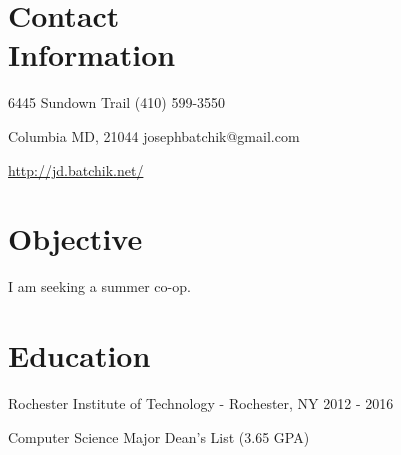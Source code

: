 \documentclass[a4paper,margin,line,11pt]{resume}
\newcommand{\rurl}[1]{\hfill {\footnotesize \url{#1}}}
\newcommand{\rdate}[1]{\hfill {\small #1}}
\begin{document}
\begin{resume}
\section{\mysidestyle Contact \\ Information}
	\begin{asparablank}
		\item 6445 Sundown Trail \hfill (410) 599-3550
		\item Columbia MD, 21044 \hfill josephbatchik@gmail.com
		\item \rurl{http://jd.batchik.net/}
	\end{asparablank}

\section{\mysidestyle Objective}
    I am seeking a summer co-op.

\section{\mysidestyle Education}
	\begin{compactdesc}
		\item[Rochester Institute of Technology] - Rochester, NY \rdate{2012 - 2016}
		\begin{compactitem} { \small
            \item Computer Science Major \hfill Dean's List (3.65 GPA)
		} \end{compactitem}
	\end{compactdesc}


\end{resume}
\end{document}
